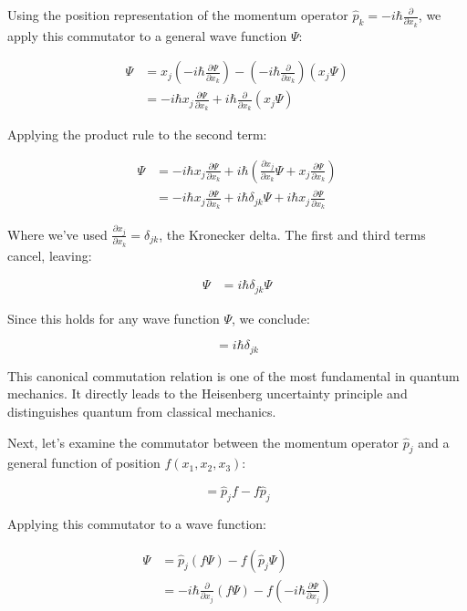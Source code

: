 \documentclass[italian]{HKNdocument}
\begin{document}
Using the position representation of the momentum operator $\hat{p}_k = -i\hbar\frac{\partial}{\partial x_k}$, we apply this commutator to a general wave function $\Psi$:

\begin{align}
[x_j, \hat{p}_k]\Psi &= x_j\left(-i\hbar\frac{\partial\Psi}{\partial x_k}\right) - \left(-i\hbar\frac{\partial}{\partial x_k}\right)(x_j\Psi) \\
&= -i\hbar x_j\frac{\partial\Psi}{\partial x_k} + i\hbar\frac{\partial}{\partial x_k}(x_j\Psi)
\end{align}

Applying the product rule to the second term:

\begin{align}
[x_j, \hat{p}_k]\Psi &= -i\hbar x_j\frac{\partial\Psi}{\partial x_k} + i\hbar\left(\frac{\partial x_j}{\partial x_k}\Psi + x_j\frac{\partial\Psi}{\partial x_k}\right)  \\
&= -i\hbar x_j\frac{\partial\Psi}{\partial x_k} + i\hbar\delta_{jk}\Psi + i\hbar x_j\frac{\partial\Psi}{\partial x_k}
\end{align}

Where we've used $\frac{\partial x_j}{\partial x_k} = \delta_{jk}$, the Kronecker delta. The first and third terms cancel, leaving:

\begin{align}
[x_j, \hat{p}_k]\Psi &= i\hbar\delta_{jk}\Psi
\end{align}

Since this holds for any wave function $\Psi$, we conclude:

\begin{equation}
[x_j, \hat{p}_k] = i\hbar\delta_{jk} \label{eq:1.59}
\end{equation}

This canonical commutation relation is one of the most fundamental in quantum mechanics. It directly leads to the Heisenberg uncertainty principle and distinguishes quantum from classical mechanics.

Next, let's examine the commutator between the momentum operator $\hat{p}_j$ and a general function of position $f(x_1,x_2,x_3)$:

\begin{equation}
[\hat{p}_j, f] = \hat{p}_j f - f\hat{p}_j
\end{equation}

Applying this commutator to a wave function:

\begin{align}
[\hat{p}_j, f]\Psi &= \hat{p}_j(f\Psi) - f(\hat{p}_j\Psi) \\
&= -i\hbar\frac{\partial}{\partial x_j}(f\Psi) - f\left(-i\hbar\frac{\partial\Psi}{\partial x_j}\right)
\end{align}
\end{document}
